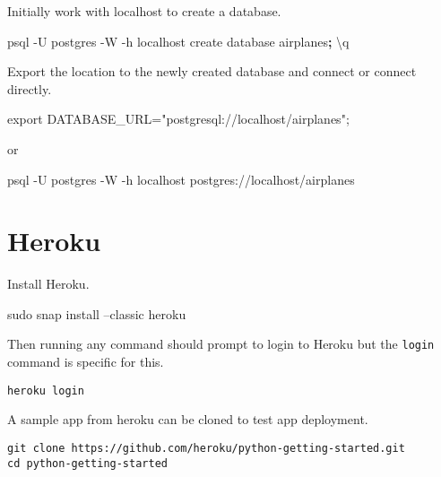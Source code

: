 \documentclass[]{book}
\newenvironment{Shaded}{\begin{snugshade}}{\end{snugshade}}
\newcommand{\KeywordTok}[1]{\textcolor[rgb]{0.13,0.29,0.53}{\textbf{#1}}}
\newcommand{\StringTok}[1]{\textcolor[rgb]{0.31,0.60,0.02}{#1}}
\newcommand{\FunctionTok}[1]{\textcolor[rgb]{0.00,0.00,0.00}{#1}}
\newcommand{\VariableTok}[1]{\textcolor[rgb]{0.00,0.00,0.00}{#1}}
\newcommand{\BuiltInTok}[1]{#1}
\newcommand{\ExtensionTok}[1]{#1}
\newcommand{\NormalTok}[1]{#1}
\begin{document}
Initially work with localhost to create a database.

\begin{Shaded}
\begin{Highlighting}[]
\ExtensionTok{psql}\NormalTok{ -U postgres -W  -h localhost}
\ExtensionTok{create}\NormalTok{ database airplanes}\KeywordTok{;}
\NormalTok{\textbackslash{}}\ExtensionTok{q}
\end{Highlighting}
\end{Shaded}

Export the location to the newly created database and connect or connect
directly.

\begin{Shaded}
\begin{Highlighting}[]
\BuiltInTok{export} \VariableTok{DATABASE_URL=}\StringTok{"postgresql://localhost/airplanes"}\NormalTok{;}
\end{Highlighting}
\end{Shaded}

or

\begin{Shaded}
\begin{Highlighting}[]
\ExtensionTok{psql}\NormalTok{ -U postgres -W  -h localhost postgres://localhost/airplanes}
\end{Highlighting}
\end{Shaded}

\section{Heroku}\label{heroku}

Install Heroku.

\begin{Shaded}
\begin{Highlighting}[]
\FunctionTok{sudo}\NormalTok{ snap install --classic heroku}
\end{Highlighting}
\end{Shaded}

Then running any command should prompt to login to Heroku but the
\texttt{login} command is specific for this.

\begin{verbatim}
heroku login
\end{verbatim}

A sample app from heroku can be cloned to test app deployment.

\begin{verbatim}
git clone https://github.com/heroku/python-getting-started.git
cd python-getting-started
\end{verbatim}
\end{document}
